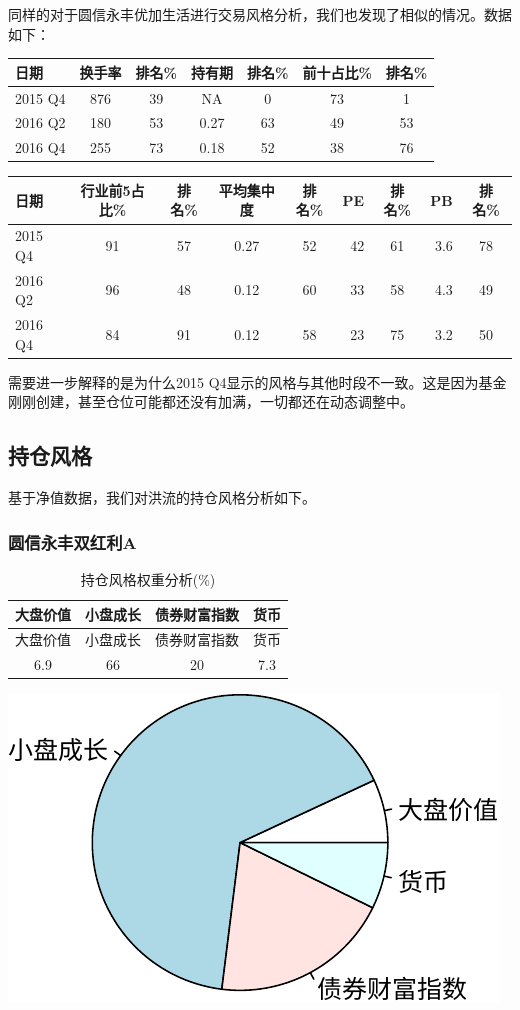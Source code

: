 \documentclass[hyperref,]{ctexart}
\begin{document}
同样的对于圆信永丰优加生活进行交易风格分析，我们也发现了相似的情况。数据如下：

\begin{longtable}[]{@{}lcccccc@{}}
\toprule
日期 & 换手率 & 排名\% & 持有期 & 排名\% & 前十占比\% &
排名\%\tabularnewline
\midrule
\endhead
2015 Q4 & 876 & 39 & NA & 0 & 73 & 1\tabularnewline
2016 Q2 & 180 & 53 & 0.27 & 63 & 49 & 53\tabularnewline
2016 Q4 & 255 & 73 & 0.18 & 52 & 38 & 76\tabularnewline
\bottomrule
\end{longtable}

\begin{longtable}[]{@{}lccccrcrc@{}}
\toprule
日期 & 行业前5占比\% & 排名\% & 平均集中度 & 排名\% & PE & 排名\% & PB &
排名\%\tabularnewline
\midrule
\endhead
2015 Q4 & 91 & 57 & 0.27 & 52 & 42 & 61 & 3.6 & 78\tabularnewline
2016 Q2 & 96 & 48 & 0.12 & 60 & 33 & 58 & 4.3 & 49\tabularnewline
2016 Q4 & 84 & 91 & 0.12 & 58 & 23 & 75 & 3.2 & 50\tabularnewline
\bottomrule
\end{longtable}

需要进一步解释的是为什么2015
Q4显示的风格与其他时段不一致。这是因为基金刚刚创建，甚至仓位可能都还没有加满，一切都还在动态调整中。

\subsection{持仓风格}

基于净值数据，我们对洪流的持仓风格分析如下。

\subsubsection{圆信永丰双红利A}\label{a-1}

\begin{longtable}[]{@{}cccc@{}}
\caption{持仓风格权重分析(\%)}\tabularnewline
\toprule
大盘价值 & 小盘成长 & 债券财富指数 & 货币\tabularnewline
\midrule
\endfirsthead
\toprule
大盘价值 & 小盘成长 & 债券财富指数 & 货币\tabularnewline
\midrule
\endhead
6.9 & 66 & 20 & 7.3\tabularnewline
\bottomrule
\end{longtable}

\includegraphics{hongliu-details_files/figure-latex/unnamed-chunk-8-1.pdf}
\end{document}
